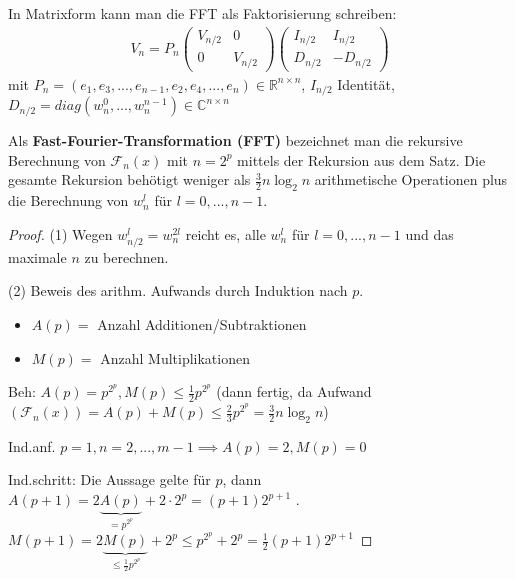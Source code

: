 \begin{remark}
	In Matrixform kann man die FFT als Faktorisierung schreiben:
	\begin{align*}
		V_n = P_n \left(\begin{matrix}
			V_{n/2} & 0\\
			0 & V_{n/2}
		\end{matrix}\right) \left(\begin{matrix}
		I_{n/2} & I_{n/2}\\
		D_{n/2} & - D_{n/2}
		\end{matrix}\right)
	\end{align*}
	mit $P_n = (e_1, e_3, ..., e_{n-1}, e_2, e_4, ..., e_n) \in \mathbb{R}^{n\times n}$, $I_{n/2}$ Identität, $D_{n/2} = diag(w_n^0, ..., w_n^{n-1}) \in \mathbb{C}^{n \times n}$
\end{remark}

\begin{corollary}
	Als \textbf{Fast-Fourier-Transformation (FFT)} bezeichnet man die rekursive Berechnung von $\mathcal{F}_n(x)$ mit $n=2^p$ mittels der Rekursion aus dem Satz. Die gesamte Rekursion behötigt weniger als $\frac{3}{2}n \log_2 n$ arithmetische Operationen plus die Berechnung von $w_n^l$ für $l = 0, ...,  n-1$.
\end{corollary}

\begin{proof}
	(1) Wegen $w_{n/2}^l = w_n^{2l}$ reicht es, alle $w_n^l$ für $l=0, ..., n-1$ und das maximale $n$ zu berechnen.
	
	(2) Beweis des arithm. Aufwands durch Induktion nach $p$.
	\begin{itemize}
		\item $A(p) = $ Anzahl Additionen/Subtraktionen
		\item $M(p) = $ Anzahl Multiplikationen
	\end{itemize}
	
	Beh: $A(p) = p^{2^p}, M(p) \leq \frac{1}{2} p^{2^p}$ (dann fertig, da Aufwand$(\mathcal{F}_n(x)) = A(p) + M(p) \leq \frac{2}{3} p^{2^p} = \frac{3}{2} n \log_2n$)
	
	Ind.anf. $p=1, n=2, ..., m-1 \implies A(p) = 2, M(p) = 0$ \checkmark
	
	Ind.schritt: Die Aussage gelte für $p$, dann $A(p+1) = 2 \underbrace{A(p)}_{=p^{2^p}} + 2 \cdot 2^p = (p+1) 2^{p+1}$ \checkmark. $M(p+1) = 2 \underbrace{M(p)}_{\leq \frac{1}{2} p^{2^p}} + 2^p \leq p^{2^p} + 2^p = \frac{1}{2} (p+1)2^{p+1}$ \checkmark
\end{proof}

